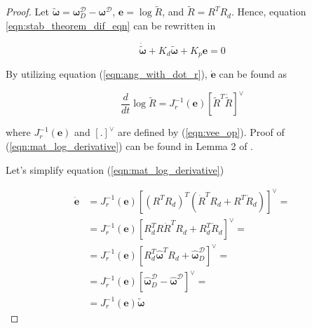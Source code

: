 \begin{proof}
    Let $\tilde{\boldsymbol{\omega}} = \boldsymbol{\omega}_D^{\mathcal{D}} - 
    \boldsymbol{\omega}^{\mathcal{D}}$, $\mathbf{e} = \log \tilde{R}$, 
    and $\tilde{R} = R^T R_d$. Hence, equation 
    \ref{eqn:stab_theorem_dif_eqn} can be rewritten in 

    \begin{equation}
        \dot{\tilde{\boldsymbol{\omega}}}
        + K_d 
        \tilde{\boldsymbol{\omega}}
        + K_p 
        \mathbf{e} = 0
        \label{eqn:stab_theorem_dif_eqn_simple}
    \end{equation}

    By utilizing equation (\ref{eqn:ang_with_dot_r}), $\dot{\mathbf{e}}$ can 
    be found as 

    \begin{equation}
        \frac{d}{dt} \log \tilde{R} 
        = J_r^{-1}(\mathbf{e}) [\tilde{R}^T \dot{\tilde{R}}]^{\vee}
        \label{eqn:mat_log_derivative}
    \end{equation}

    where $J_r^{-1}(\mathbf{e})$ and $[.]^{\vee}$ are defined by 
    (\ref{eqn:vee_op}). Proof of (\ref{eqn:mat_log_derivative}) 
    can be found in Lemma 2 of \cite{ANonlinearObserverUsingPose}.

    Let's simplify equation (\ref{eqn:mat_log_derivative}) 

    \begin{equation}
        \begin{aligned}
            \dot{\mathbf{e}} & = 
            J_r^{-1}(\mathbf{e}) 
            [(R^T R_d)^T (\dot{R}^T R_d + R^T \dot{R}_d)]^{\vee} = \\
            & = J_r^{-1}(\mathbf{e}) 
            [R_d^T R \dot{R}^T R_d + R_d^T \dot{R}_d]^{\vee} = \\
            & = J_r^{-1}(\mathbf{e}) 
            [
                R_d^T \hat{\boldsymbol{\omega}}^T R_d + 
                \hat{\boldsymbol{\omega}}_D^{\mathcal{D}}
            ]^{\vee} = \\ 
            & = J_r^{-1}(\mathbf{e})
            [
                \hat{\boldsymbol{\omega}}_D^{\mathcal{D}} - 
                \hat{\boldsymbol{\omega}}^{\mathcal{D}}
            ]^{\vee} = \\
            & = J_r^{-1}(\mathbf{e}) \tilde{\boldsymbol{\omega}}
        \end{aligned}
        \label{eqn:mat_log_der_simple}
    \end{equation}


\end{proof}
